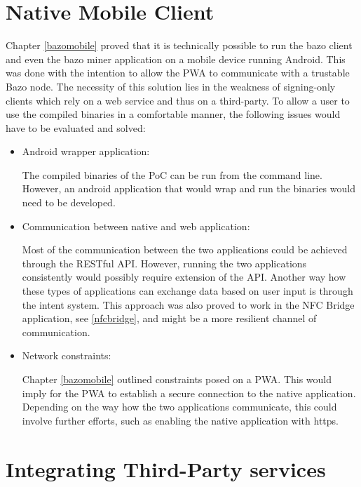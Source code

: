 \section{Native Mobile Client}
Chapter \ref{bazomobile} proved that it is technically possible to run the bazo client and even the bazo miner application on a mobile device running Android. This was done with the intention to allow the PWA to communicate with a trustable Bazo node. The necessity of this solution lies in the weakness of signing-only clients which rely on a web service and thus on a third-party. To allow a user to use the compiled binaries in a comfortable manner, the following issues would have to be evaluated and solved:
\begin{itemize}
\item Android wrapper application:

The compiled binaries of the PoC can be run from the command line. However, an android application that would wrap and run the binaries would need to be developed.
\item Communication between native and web application:

Most of the communication between the two applications could be achieved through the RESTful API. However, running the two applications consistently would possibly require extension of the API. Another way how these types of applications can exchange data based on user input is through the intent system. This approach was also proved to work in the NFC Bridge application, see \ref{nfcbridge}, and might be a more resilient channel of communication.
\item Network constraints:

Chapter \ref{bazomobile} outlined constraints posed on a PWA. This would imply for the PWA to establish a secure connection to the native application. Depending on the way how the two applications communicate, this could involve further efforts, such as enabling the native application with https.
\end{itemize}


\section{Integrating Third-Party services}

